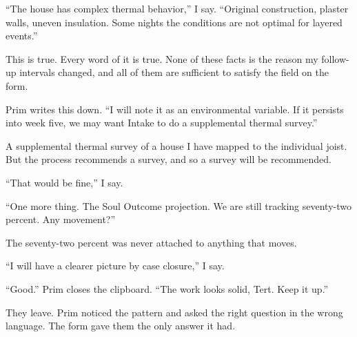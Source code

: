 ``The house has complex thermal behavior,'' I say. ``Original construction, plaster walls, uneven insulation. Some nights the conditions are not optimal for layered events.''

This is true. Every word of it is true. None of these facts is the reason my follow-up intervals changed, and all of them are sufficient to satisfy the field on the form.

Prim writes this down. ``I will note it as an environmental variable. If it persists into week five, we may want Intake to do a supplemental thermal survey.''

A supplemental thermal survey of a house I have mapped to the individual joist. But the process recommends a survey, and so a survey will be recommended.

``That would be fine,'' I say.

``One more thing. The Soul Outcome projection. We are still tracking seventy-two percent. Any movement?''

The seventy-two percent was never attached to anything that moves.

``I will have a clearer picture by case closure,'' I say.

``Good.'' Prim closes the clipboard. ``The work looks solid, Tert. Keep it up.''

They leave. Prim noticed the pattern and asked the right question in the wrong language. The form gave them the only answer it had.
